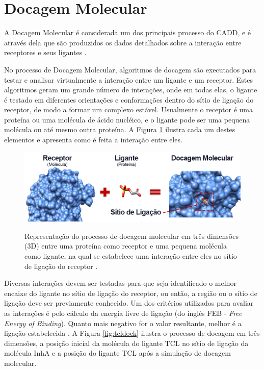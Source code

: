 \section{Docagem Molecular}

A Docagem Molecular é considerada um dos principais processo do CADD, e é através dela que são produzidos os dados detalhados sobre a interação entre receptores e seus ligantes \cite{LEN96}. 

No processo de Docagem Molecular, algoritmos de docagem são executados para testar e analisar virtualmente a interação entre um ligante e um receptor. Estes algoritmos geram um grande número de interações, onde em todas elas, o ligante é testado em diferentes orientações e conformações dentro do sítio de ligação do receptor, de modo a formar um complexo estável. 
Usualmente o receptor é uma proteína ou uma molécula de ácido nucléico, e o ligante pode ser uma pequena molécula ou até mesmo outra proteína. A Figura \ref{fig:docking} \cite{ALE13} ilustra cada um destes elementos e apresenta como é feita a interação entre eles.

\begin{figure}[h]
	\center
	\includegraphics[width=14cm]{images/docking.png}
	\label{fig:docking}
	\caption{Representação do processo de docagem molecular em três dimensões (3D) entre uma proteína como receptor e uma pequena molécula como ligante, na qual se estabelece uma interação entre eles no sítio de ligação do receptor \cite{ALE13}.}
\end{figure}

Diversas interações devem ser testadas para que seja identificado o melhor encaixe do ligante no sítio de ligação do receptor, ou então, a região ou o sítio de ligação deve ser previamente conhecido. Um dos critérios utilizados para avaliar as interações é pelo cálculo da energia livre de ligação (do inglês FEB - \emph{Free Energy of Binding}). Quanto mais negativo for o valor resultante, melhor é a ligação estabelecida \cite{kar07}. A Figura \ref{fig:tcldock} \cite{REN13} ilustra o processo de docagem em três dimensões, a posição inicial da molécula do ligante TCL no sítio de ligação da molécula InhA e a posição do ligante TCL após a simulação de docagem molecular.

